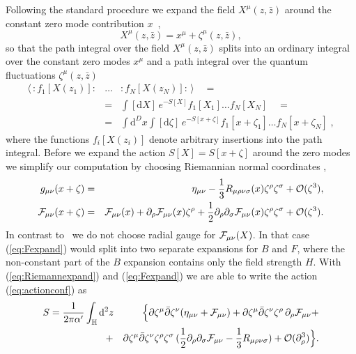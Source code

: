 \documentclass[a4paper,12pt]{article}
\let\bra=\langle        \let\ket=\rangle
\newcommand {\ud} {\mathrm{d}}
\newcommand {\cF} {{\cal F}}
\newcommand {\cO}{{\cal O}}
\newcommand {\bbH}{\mathbb{H}}
\newcommand {\Back}{\!\!\!\!\!}
\begin{document}
Following the standard procedure we expand the field 
$X^\mu(z,\bar z)$ around the constant zero mode contribution 
$x$~\cite{Fradkin:1985qd},
\begin{equation}
  \label{eq:quantumfield}
  X^\mu(z,\bar z) = x^\mu + \zeta^\mu(z,\bar z),
\end{equation}
so that the path integral over the field $X^\mu(z,\bar z)$ splits into an
ordinary integral over the constant zero modes $x^\mu$ and a
path integral over the quantum fluctuations $\zeta^\mu(z,\bar z)$
\begin{eqnarray}
  \label{eq:pathint}
  \bra \,:\!f_1[X(z_1)]\!: &\ldots& :\!f_N[X(z_N)]\!: \,\ket 
  \quad = \nonumber \\
  &=& \int [\ud X]\, e^{-S[X]} f_1[X_1]\! \ldots f_N[X_N] 
  \quad = \nonumber\\
  &=& \int \ud^D x \int [\ud \zeta]\, e^{-S[x\!+\!\zeta]}
  f_1[x\!+\!\zeta_1] \ldots f_N[x\!+\!\zeta_N]\; ,
\end{eqnarray}
where the functions $f_i[X(z_i)]$ denote arbitrary
insertions into the path integral. %
Before we expand
the action $S[X] = S[x + \zeta]$ around the zero modes we simplify our
computation by choosing Riemannian normal coordinates
\cite{Alvarez-Gaume:1981hn,Braaten:1985is},
\begin{eqnarray}
  \label{eq:Riemannexpand}
  g_{\mu\nu}(x+\zeta) &=& \eta_{\mu\nu} - 
                    \frac 13 R_{\mu\rho\nu\sigma}(x) \zeta^\rho \zeta^\sigma + 
                    \cO(\zeta^3) , \\
  \label{eq:Fexpand}
  \cF_{\mu\nu}(x+\zeta) &=& \cF_{\mu\nu}(x)+ 
                      \partial_\rho \cF_{\mu\nu}(x) \zeta^\rho +
                      \frac 12 \partial_\rho \partial_\sigma 
                      \cF_{\mu\nu}(x) \zeta^\rho \zeta^\sigma +
                      \cO(\zeta^3).
\end{eqnarray}
In contrast to~\cite{Cornalba:2001sm} we do not choose 
radial gauge for $\cF_{\mu\nu}(X)$. In that case (\ref{eq:Fexpand})
would split into two separate expansions for $B$ and $F$, where 
the non-constant part of the $B$ expansion contains only the field 
strength $H$. 
With (\ref{eq:Riemannexpand}) and (\ref{eq:Fexpand}) we are able to 
write the action (\ref{eq:actionconf}) as
\begin{eqnarray}
  \label{eq:pertexp}
  S = \frac 1{2\pi\alpha'} \int _\bbH \ud^2z \Back & & \Back
        {\Bigl\{\partial \zeta^\mu \bar\partial \zeta^\nu 
         (\eta_{\mu\nu} + \cF_{\mu\nu})} +
         \partial \zeta^\mu \bar\partial \zeta^\nu \zeta^\rho \,
         \partial_\rho \cF_{\mu\nu} + \nonumber\\
     &+& \partial \zeta^\mu \bar\partial \zeta^\nu \zeta^\rho \zeta^\sigma \,
         ( \frac 12 \partial_\rho \partial_\sigma \cF_{\mu\nu}
         - \frac 13 R_{\mu\rho\nu\sigma} )
         + \cO(\partial_{\rho}^3) \Bigr\}.
\end{eqnarray}
\end{document}
